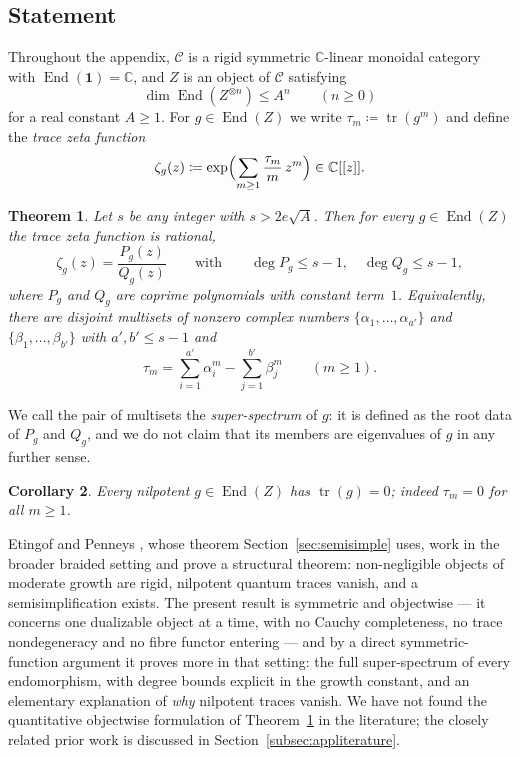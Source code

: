 \documentclass[11pt]{article}
\newtheorem{theo}{Theorem}[section]
\newtheorem{coro}[theo]{Corollary}
\newcommand{\unitobj}{\mathbf{1}}                 %
\newcommand{\End}{\operatorname{End}}
\newcommand{\tr}{\operatorname{tr}}
\newcommand{\tzeta}[1]{\zeta_{#1}}                %
\begin{document}
\subsection{Statement}\label{subsec:appstatement}

Throughout the appendix, $\mathcal{C}$ is a rigid symmetric
$\mathbb{C}$-linear monoidal category with
$\End(\unitobj)=\mathbb{C}$, and $Z$ is an object of $\mathcal{C}$
satisfying
\begin{equation}\label{eq:growth}
\dim\End(Z^{\otimes n})\le A^{n}\qquad(n\ge 0)
\end{equation}
for a real constant $A\ge 1$. For $g\in\End(Z)$ we write
$\tau_{m}\coloneqq\tr(g^{m})$ and define the \emph{trace zeta
function}
\[
\tzeta{g}(z)\coloneqq
\exp\Bigl(\sum_{m\ge1}\frac{\tau_{m}}{m}\,z^{m}\Bigr)
\in\mathbb{C}[[z]].
\]

\begin{theo}\label{theo:zeta}
Let $s$ be any integer with $s>2e\sqrt{A}$. Then for every
$g\in\End(Z)$ the trace zeta function is rational,
\[
\tzeta{g}(z)=\frac{P_{g}(z)}{Q_{g}(z)}
\qquad\text{with}\qquad
\deg P_{g}\le s-1,\quad \deg Q_{g}\le s-1,
\]
where $P_{g}$ and $Q_{g}$ are coprime polynomials with constant
term~$1$. Equivalently, there are disjoint multisets of nonzero
complex numbers $\{\alpha_{1},\dotsc,\alpha_{a'}\}$ and
$\{\beta_{1},\dotsc,\beta_{b'}\}$ with $a',b'\le s-1$ and
\[
\tau_{m}=\sum_{i=1}^{a'}\alpha_{i}^{m}
-\sum_{j=1}^{b'}\beta_{j}^{m}
\qquad(m\ge1).
\]
\end{theo}

We call the pair of multisets the \emph{super-spectrum} of $g$: it
is defined as the root data of $P_{g}$ and $Q_{g}$, and we do not
claim that its members are eigenvalues of $g$ in any further sense.

\begin{coro}\label{coro:nilpotent}
Every nilpotent $g\in\End(Z)$ has $\tr(g)=0$; indeed
$\tau_{m}=0$ for all $m\ge1$.
\end{coro}

Etingof and Penneys \cite{EP26}, whose theorem
Section~\ref{sec:semisimple} uses, work in the broader braided
setting and prove a structural theorem: non-negligible objects of
moderate growth are rigid, nilpotent quantum traces vanish, and a
semisimplification exists. The present result is symmetric and
objectwise --- it concerns one dualizable object at a time, with
no Cauchy completeness, no trace nondegeneracy and no fibre
functor entering --- and by a direct symmetric-function argument
it proves more in that setting: the full super-spectrum of every
endomorphism, with degree bounds explicit in the growth constant,
and an elementary explanation of \emph{why} nilpotent traces
vanish. We have not
found the quantitative objectwise formulation of
Theorem~\ref{theo:zeta} in the literature; the closely related
prior work is discussed in
Section~\ref{subsec:appliterature}.
\end{document}
